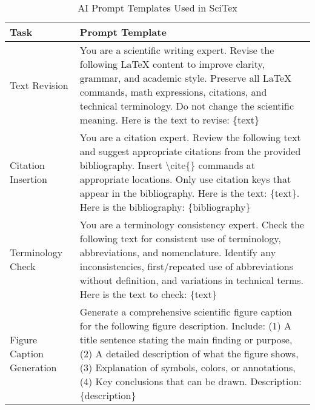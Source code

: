 

\begin{table}[ht!]
\centering
\caption{AI Prompt Templates Used in SciTex}
\label{tab:prompts}
\begin{tabular}{p{3cm}p{10cm}}
\hline
\textbf{Task} & \textbf{Prompt Template} \\
\hline
Text Revision & You are a scientific writing expert. Revise the following LaTeX content to improve clarity, grammar, and academic style. Preserve all LaTeX commands, math expressions, citations, and technical terminology. Do not change the scientific meaning. Here is the text to revise: \{text\} \\
\hline
Citation Insertion & You are a citation expert. Review the following text and suggest appropriate citations from the provided bibliography. Insert \textbackslash cite\{\} commands at appropriate locations. Only use citation keys that appear in the bibliography. Here is the text: \{text\}. Here is the bibliography: \{bibliography\} \\
\hline
Terminology Check & You are a terminology consistency expert. Check the following text for consistent use of terminology, abbreviations, and nomenclature. Identify any inconsistencies, first/repeated use of abbreviations without definition, and variations in technical terms. Here is the text to check: \{text\} \\
\hline
Figure Caption Generation & Generate a comprehensive scientific figure caption for the following figure description. Include: (1) A title sentence stating the main finding or purpose, (2) A detailed description of what the figure shows, (3) Explanation of symbols, colors, or annotations, (4) Key conclusions that can be drawn. Description: \{description\} \\
\hline
\end{tabular}
\end{table}

